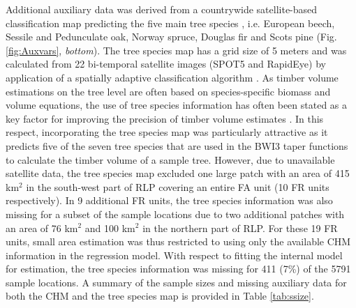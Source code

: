 Additional auxiliary data was derived from a countrywide satellite-based classification map predicting the five main tree species \citep{stoffels2015}, i.e. European beech, Sessile and Pedunculate oak, Norway spruce, Douglas fir and Scots pine (Fig. \ref{fig:Auxvars}, \textit{bottom}). The tree species map has a grid size of 5 meters and was calculated from 22 bi-temporal satellite images (SPOT5 and RapidEye) by application of a spatially adaptive classification algorithm \citep{stoffels2012}. As timber volume estimations on the tree level are often based on species-specific biomass and volume equations, the use of tree species information has often been stated as a key factor for improving the precision of timber volume estimates \cite{white2016}. In this respect, incorporating the tree species map was particularly attractive as it predicts five of the seven tree species that are used in the BWI3 taper functions \citep{kublin2013} to calculate the timber volume of a sample tree. However, due to unavailable satellite data, the tree species map excluded one large patch with an area of 415 km$^2$ in the south-west part of RLP covering an entire FA unit (10 FR units respectively). In 9 additional FR units, the tree species information was also missing for a subset of the sample locations due to two additional patches with an area of 76 km$^2$ and 100 km$^2$ in the northern part of RLP. For these 19 FR units, small area estimation was thus restricted to using only the available CHM information in the regression model. With respect to fitting the internal model for estimation, the tree species information was missing for 411 (7\%) of the 5791 sample locations. A summary of the sample sizes and missing auxiliary data for both the CHM and the tree species map is provided in Table \ref{tab:ssize}.

